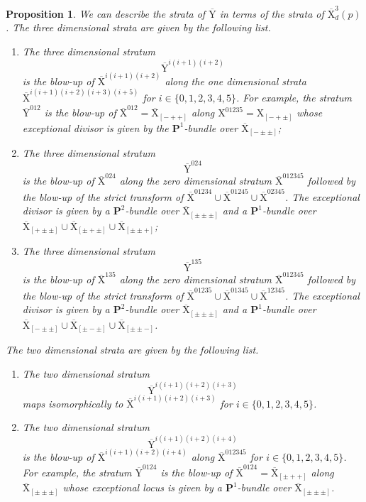 \documentclass[10pt]{amsart}
\numberwithin{equation}{section}
\theoremstyle{plain}
\newtheorem{proposition}[theorem]{Proposition}
\numberwithin{equation}{section}
\theoremstyle{definition}
\theoremstyle{remark}
\def\PP{\mathbf{P}}
\def\rmX{\mathrm{X}}
\def\rmXbar{\overline{\rmX}}
\def\rmY{\mathrm{Y}}
\def\rmYbar{\overline{\rmY}}
\begin{document}
\begin{proposition} \label{Ybar}
We can describe the strata of $\rmYbar$ in terms of the strata of $\rmXbar^{3}_{d}(p)$. The three dimensional strata are given by the following list.
\begin{enumerate}
\item The three dimensional stratum 
\begin{equation*}
\rmYbar^{i(i+1)(i+2)}
\end{equation*}
is the blow-up of $\rmXbar^{i(i+1)(i+2)}$ along the one dimensional strata $\rmXbar^{i(i+1)(i+2)(i+3)(i+5)}$ for $i\in \{0,1, 2, 3, 4, 5\}$. For example, the stratum $\rmYbar^{012}$ is the blow-up of $\rmXbar^{012}=\rmXbar_{[-++]}$ along $\rmX^{01235}=\rmX_{[-+\pm]}$ whose exceptional divisor is given by the $\PP^{1}$-bundle over $\rmXbar_{[-\pm\pm]}$;

\item The three dimensional stratum $$\rmYbar^{024}$$
is the blow-up of $\rmXbar^{024}$ along the zero dimensional stratum $\rmXbar^{012345}$ followed by the blow-up of the strict transform of $\rmXbar^{01234}\cup \rmXbar^{01245}\cup \rmXbar^{02345}$. The exceptional divisor is given by a $\PP^{2}$-bundle over $\rmXbar_{[\pm\pm\pm]}$ and a $\PP^{1}$-bundle over $\rmXbar_{[+\pm\pm]}\cup\rmXbar_{[\pm+\pm]}\cup\rmXbar_{[\pm\pm+]}$;

\item The three dimensional stratum $$\rmYbar^{135}$$
is the blow-up of $\rmXbar^{135}$ along the zero dimensional stratum $\rmXbar^{012345}$ followed by the blow-up of the strict transform of $\rmXbar^{01235}\cup \rmXbar^{01345}\cup \rmXbar^{12345}$. The exceptional divisor is given by a $\PP^{2}$-bundle over $\rmXbar_{[\pm\pm\pm]}$ and a $\PP^{1}$-bundle over $\rmXbar_{[-\pm\pm]}\cup\rmXbar_{[\pm-\pm]}\cup\rmXbar_{[\pm\pm-]}$.
\end{enumerate}

The two dimensional strata are given by the following list.
\begin{enumerate}
\item The two dimensional stratum $$\rmYbar^{i(i+1)(i+2)(i+3)}$$
maps isomorphically to $\rmXbar^{i(i+1)(i+2)(i+3)}$ for $i\in\{0, 1, 2, 3, 4, 5\}$.

\item The two dimensional stratum $$\rmYbar^{i(i+1)(i+2)(i+4)}$$
is the blow-up of $\rmXbar^{i(i+1)(i+2)(i+4)}$ along $\rmXbar^{012345}$ for $i\in\{0, 1, 2, 3, 4, 5\}$. For example, the stratum $\rmYbar^{0124}$ is the blow-up of $\rmXbar^{0124}=\rmXbar_{[\pm++]}$ along $\rmXbar_{[\pm\pm\pm]}$ whose exceptional locus is given by a $\PP^{1}$-bundle over $\overline{\rmX}_{[\pm\pm\pm]}$.


\end{enumerate}
\end{proposition}
\end{document}

